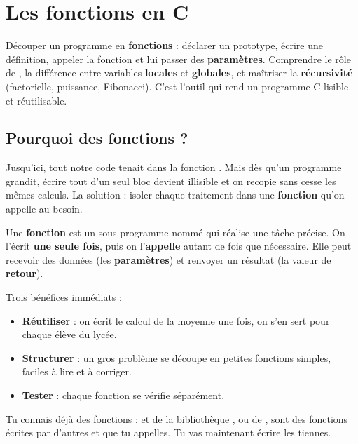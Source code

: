 \chapter{Les fonctions en C}

\begin{synthese}[Au programme]
Découper un programme en \textbf{fonctions} : déclarer un prototype, écrire une
définition, appeler la fonction et lui passer des \textbf{paramètres}. Comprendre
le rôle de , la différence entre variables \textbf{locales} et
\textbf{globales}, et maîtriser la \textbf{récursivité} (factorielle, puissance,
Fibonacci). C'est l'outil qui rend un programme C lisible et réutilisable.
\end{synthese}

\section{Pourquoi des fonctions ?}

Jusqu'ici, tout notre code tenait dans la fonction . Mais dès qu'un
programme grandit, écrire tout d'un seul bloc devient illisible et on recopie
sans cesse les mêmes calculs. La solution : isoler chaque traitement dans une
\textbf{fonction} qu'on appelle au besoin.

\begin{definition}
Une \textbf{fonction} est un sous-programme nommé qui réalise une tâche précise.
On l'écrit \textbf{une seule fois}, puis on l'\textbf{appelle} autant de fois que
nécessaire. Elle peut recevoir des données (les \textbf{paramètres}) et renvoyer
un résultat (la valeur de \textbf{retour}).
\end{definition}

Trois bénéfices immédiats :
\begin{itemize}
  \item \textbf{Réutiliser} : on écrit le calcul de la moyenne une fois, on s'en
        sert pour chaque élève du lycée.
  \item \textbf{Structurer} : un gros problème se découpe en petites fonctions
        simples, faciles à lire et à corriger.
  \item \textbf{Tester} : chaque fonction se vérifie séparément.
\end{itemize}

\begin{remarque}
Tu connais déjà des fonctions :  et  de la bibliothèque
, ou  de , sont des fonctions écrites
par d'autres et que tu appelles. Tu vas maintenant écrire les tiennes.
\end{remarque}

